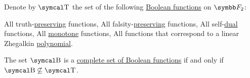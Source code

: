 \begin{theorem}\label{thm:posts_completeness_theorem}
  Denote by \( \CT \) the set of the following \hyperref[def:boolean_function]{Boolean functions} on \( \BF_2 \):
  \begin{PropEnum}
     All truth-\hyperref[def:boolean_functions_in_f2/truth_preserving]{preserving} functions,
     All falsity-\hyperref[def:boolean_functions_in_f2/falsity_preserving]{preserving} functions,
     All self-\hyperref[def:boolean_functions_in_f2/self_dual]{dual} functions,
     All \hyperref[def:boolean_functions_in_f2/self_dual]{monotone} functions,
     All functions that correspond to a linear Zhegalkin \hyperref[def:zhegalkin_polynomial]{polynomial}.
  \end{PropEnum}

  The set \( \CB \) is a \hyperref[def:boolean_closure]{complete set of Boolean functions} if and only if \( \CB \not\subseteq \CT \).
\end{theorem}

